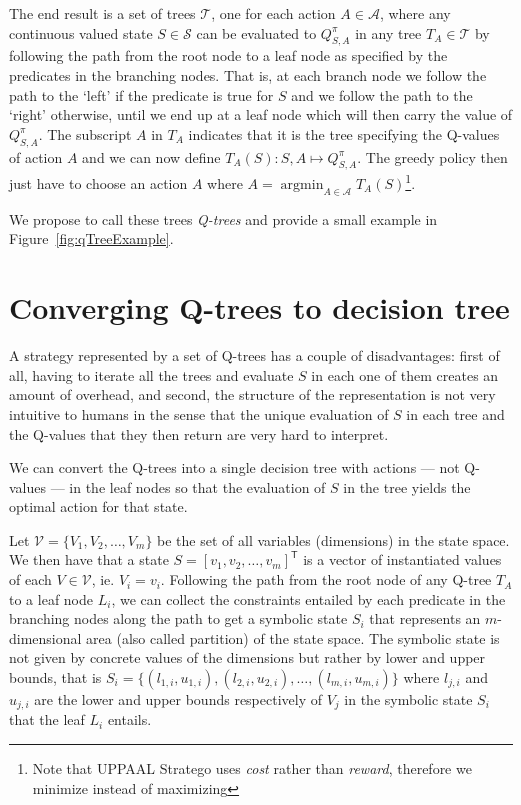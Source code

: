 \documentclass{article}
\DeclareMathOperator*{\argmin}{argmin}
\DeclareMathOperator*{\tran}{\mathsf{T}}
\begin{document}
The end result is a set of trees $\mathcal{T}$, one for each action $A \in
\mathcal{A}$, where any continuous valued state $S \in \mathcal{S}$ can be
evaluated to $Q^{\pi}_{S,A}$ in
any tree $T_A \in \mathcal{T}$ by following the path from the root node to a
leaf node as specified by the predicates in the branching nodes. That is, at
each branch node we follow the path to the `left' if the predicate is true for
$S$ and we follow the path to the `right' otherwise, until we end up at a leaf
node which will then carry the value of $Q^{\pi}_{S,A}$. The subscript $A$ in
$T_A$ indicates that it is the tree specifying the Q-values of action $A$ and we
can now define $T_A(S): S, A \mapsto Q^{\pi}_{S,A}$. The greedy policy then just
have to choose an action $A$ where $A = \argmin_{A \in \mathcal{A}}
T_A(S)$\footnote{Note that UPPAAL Stratego uses \textit{cost} rather than
\textit{reward}, therefore we minimize instead of maximizing}.

We propose to call these trees \textit{Q-trees} and provide a small example in
Figure~\ref{fig:qTreeExample}.



\section{Converging Q-trees to decision tree}%
\label{sec:convergeToDT}

A strategy represented by a set of Q-trees has a couple of disadvantages: first
of all, having to iterate all the trees and evaluate $S$ in each one of them
creates an amount of overhead, and second, the structure of
the representation is not very intuitive to humans in the sense that the unique
evaluation of $S$ in each tree and the Q-values that they then return are very
hard to interpret.

We can convert the Q-trees into a single decision tree with actions --- not
Q-values --- in the leaf nodes so that the evaluation of $S$ in the tree yields
the optimal action for that state.

Let $\mathcal{V} = \{ V_1, V_2, \ldots, V_m \}$ be the set of all variables
(dimensions) in the state space. We then have that a state $S = {[v_1, v_2,
\ldots, v_m]}^{\tran}$ is a vector of instantiated values of each $V \in
\mathcal{V}$, ie. $V_i = v_i$. Following the path from the root node of any
Q-tree $T_A$ to a leaf node $L_i$, we can collect the constraints entailed by
each predicate in the branching nodes along the path to get a symbolic state
$S_i$ that represents an $m$-dimensional area (also called partition) of the
state space. The symbolic state is not given by concrete values of the
dimensions but rather by lower and upper bounds, that is $S_i = \{ (l_{1,i},
u_{1,i}), (l_{2,i}, u_{2,i}), \ldots, (l_{m,i}, u_{m,i}) \}$ where $l_{j,i}$ and
$u_{j,i}$ are the lower and upper bounds respectively of $V_j$ in the symbolic
state $S_i$ that the leaf $L_i$ entails.
\end{document}
